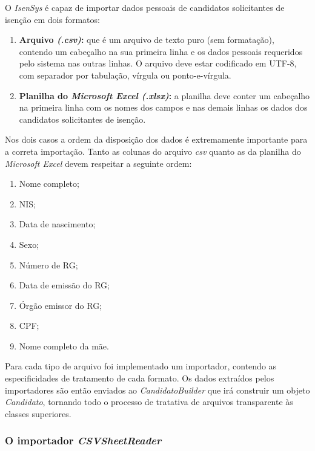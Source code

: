 \documentclass[
	12pt,			%
	openright,		%
	oneside,	
	a4paper,		%
	english,		%
	brazil			%
]{abntex2/abntex2}  %
\begin{document}
				O \textit{IsenSys} é capaz de importar dados pessoais de candidatos solicitantes de isenção em dois formatos:
	
				\begin{enumerate}
					
					\item \textbf{Arquivo \textit{(.csv)}:} que é um arquivo de texto puro (sem formatação), contendo um cabeçalho na sua primeira linha e os dados pessoais requeridos pelo sistema nas outras linhas. O arquivo deve estar codificado em UTF-8, com separador por tabulação, vírgula ou ponto-e-vírgula.
					
					\item \textbf{Planilha do \textit{Microsoft Excel (.xlsx)}:} a planilha deve conter um cabeçalho na primeira linha com os nomes dos campos e nas demais linhas os dados dos candidatos solicitantes de isenção.
					
				\end{enumerate}

				Nos dois casos a ordem da disposição dos dados é extremamente importante para a correta importação. Tanto as colunas do arquivo \textit{csv} quanto as da planilha do \textit{Microsoft Excel} devem respeitar a seguinte ordem:
	
				\begin{enumerate}
					
					\item Nome completo;
					\item NIS;
					\item Data de nascimento;
					\item Sexo;
					\item Número de RG;
					\item Data de emissão do RG;
					\item Órgão emissor do RG;
					\item CPF;
					\item Nome completo da mãe.
					
				\end{enumerate}
	
				Para cada tipo de arquivo foi implementado um importador, contendo as especificidades de tratamento de cada formato. Os dados extraídos pelos importadores são então enviados ao \textit{CandidatoBuilder} que irá construir um objeto \textit{Candidato}, tornando todo o processo de tratativa de arquivos transparente às classes superiores.
	
				\subsubsection{O importador \textit{CSVSheetReader}}
	
\end{document}
